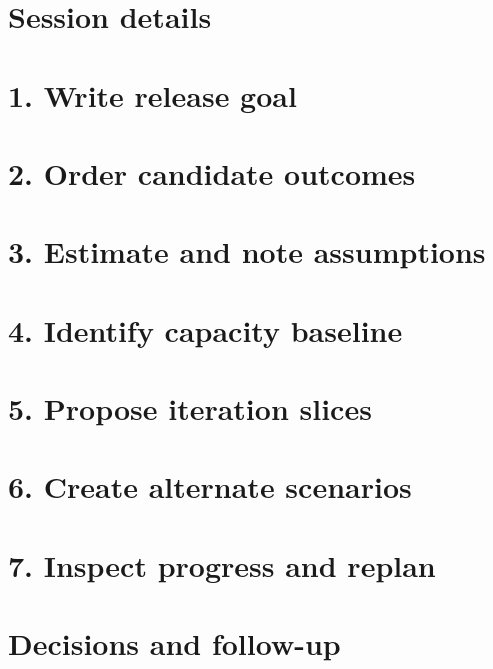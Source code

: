 \documentclass[11pt,letterpaper]{article}
\begin{document}
\section{Session details}
\section{1. Write release goal}
\section{2. Order candidate outcomes}
\clearpage
\section{3. Estimate and note assumptions}
\section{4. Identify capacity baseline}
\clearpage
\section{5. Propose iteration slices}
\section{6. Create alternate scenarios}
\clearpage
\section{7. Inspect progress and replan}
\section{Decisions and follow-up}
\end{document}
